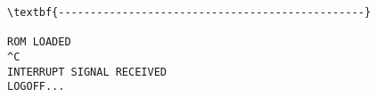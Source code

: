 









\label{epilogue}



\newpage
\thispagestyle{empty}
\null\vspace{26\baselineskip}
\begin{center}
\begin{BVerbatim}[baseline=t,commandchars=\\\{\}]
\textbf{------------------------------------------------}

ROM LOADED
^C
INTERRUPT SIGNAL RECEIVED
LOGOFF...
\end{BVerbatim}
\end{center}

